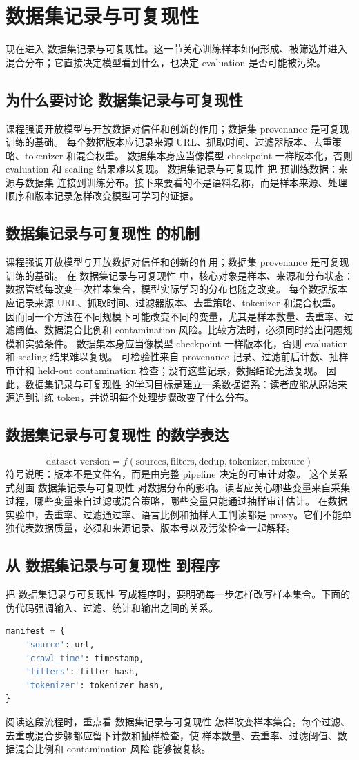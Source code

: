 \documentclass[a4paper]{article}
\begin{document}
\section{数据集记录与可复现性}
现在进入 数据集记录与可复现性。这一节关心训练样本如何形成、被筛选并进入混合分布；它直接决定模型看到什么，也决定 evaluation 是否可能被污染。
\subsection{为什么要讨论 数据集记录与可复现性}
课程强调开放模型与开放数据对信任和创新的作用；数据集 provenance 是可复现训练的基础。
每个数据版本应记录来源 URL、抓取时间、过滤器版本、去重策略、tokenizer 和混合权重。
数据集本身应当像模型 checkpoint 一样版本化，否则 evaluation 和 scaling 结果难以复现。
数据集记录与可复现性 把 预训练数据：来源与数据集 连接到训练分布。接下来要看的不是语料名称，而是样本来源、处理顺序和版本记录怎样改变模型可学习的证据。
\subsection{数据集记录与可复现性 的机制}
课程强调开放模型与开放数据对信任和创新的作用；数据集 provenance 是可复现训练的基础。 在 数据集记录与可复现性 中，核心对象是样本、来源和分布状态：数据管线每改变一次样本集合，模型实际学习的分布也随之改变。
每个数据版本应记录来源 URL、抓取时间、过滤器版本、去重策略、tokenizer 和混合权重。 因而同一个方法在不同规模下可能改变不同的变量，尤其是样本数量、去重率、过滤阈值、数据混合比例和 contamination 风险。比较方法时，必须同时给出问题规模和实验条件。
数据集本身应当像模型 checkpoint 一样版本化，否则 evaluation 和 scaling 结果难以复现。 可检验性来自 provenance 记录、过滤前后计数、抽样审计和 held-out contamination 检查；没有这些记录，数据结论无法复现。
因此，数据集记录与可复现性 的学习目标是建立一条数据谱系：读者应能从原始来源追到训练 token，并说明每个处理步骤改变了什么分布。
\subsection{数据集记录与可复现性 的数学表达}
\[\text{dataset version}=f(\text{sources},\text{filters},\text{dedup},\text{tokenizer},\text{mixture})\]
符号说明：版本不是文件名，而是由完整 pipeline 决定的可审计对象。
这个关系式刻画 数据集记录与可复现性 对数据分布的影响。读者应关心哪些变量来自采集过程，哪些变量来自过滤或混合策略，哪些变量只能通过抽样审计估计。
在数据实验中，去重率、过滤通过率、语言比例和抽样人工判读都是 proxy。它们不能单独代表数据质量，必须和来源记录、版本号以及污染检查一起解释。
\subsection{从 数据集记录与可复现性 到程序}
把 数据集记录与可复现性 写成程序时，要明确每一步怎样改写样本集合。下面的伪代码强调输入、过滤、统计和输出之间的关系。
\begin{lstlisting}[language=Python]
manifest = {
    'source': url,
    'crawl_time': timestamp,
    'filters': filter_hash,
    'tokenizer': tokenizer_hash,
}
\end{lstlisting}
阅读这段流程时，重点看 数据集记录与可复现性 怎样改变样本集合。每个过滤、去重或混合步骤都应留下计数和抽样检查，使 样本数量、去重率、过滤阈值、数据混合比例和 contamination 风险 能够被复核。
\end{document}
